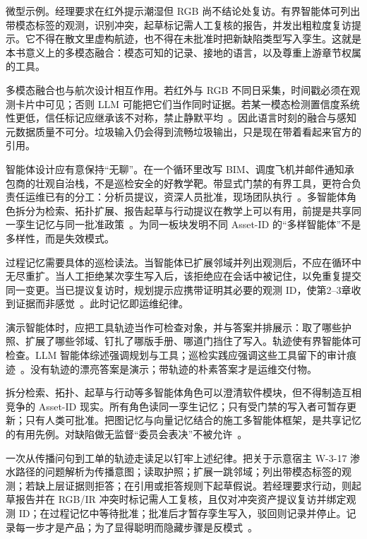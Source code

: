 微型示例。经理要求在红外提示潮湿但 RGB 尚不结论处复访。有界智能体可列出带模态标签的观测，识别冲突，起草标记需人工复核的报告，并发出粗粒度复访提示。它不得在散文里虚构航迹，也不得在未批准时把新缺陷类型写入孪生。这就是本书意义上的多模态融合：模态可知的记录、接地的语言，以及尊重上游章节权属的工具。

多模态融合也与航次设计相互作用。若红外与 RGB 不同日采集，时间戳必须在观测卡片中可见；否则 LLM 可能把它们当作同时证据。若某一模态检测置信度系统性更低，信任标记应继承该不对称，禁止静默平均~\cite{zhao2024facade,zhao2026physical}。因此语言时刻的融合与感知元数据质量不可分。垃圾输入仍会得到流畅垃圾输出，只是现在带着看起来官方的引用。

智能体设计应有意保持``无聊''。在一个循环里改写 BIM、调度飞机并邮件通知承包商的壮观自治栈，不是巡检安全的好教学靶。带显式门禁的有界工具，更符合负责任运维已有的分工：分析员提议，资深人员批准，现场团队执行~\cite{luo2025llmdtrobot,gao2026ifcagent,zhang2025llmagentschema}。多智能体角色拆分为检索、拓扑扩展、报告起草与行动提议在教学上可以有用，前提是共享同一孪生记忆与同一批准政策~\cite{wang2024surveyagents,li2024surveymultiagent,rawat2025llmmas}。为同一板块发明不同 Asset-ID 的``多样智能体''不是多样性，而是失效模式。

过程记忆需要具体的巡检读法。当智能体已扩展邻域并列出观测后，不应在循环中无尽重扩。当人工拒绝某次孪生写入后，该拒绝应在会话中被记住，以免重复提交同一变更。当已提议复访时，规划提示应携带证明其必要的观测 ID，使第2--3章收到证据而非感觉~\cite{yao2023react,rawat2025llmmas}。此时记忆即运维纪律。



演示智能体时，应把工具轨迹当作可检查对象，并与答案并排展示：取了哪些护照、扩展了哪些邻域、钉扎了哪版手册、哪道门挡住了写入。轨迹使有界智能体可检查。LLM 智能体综述强调规划与工具；巡检实践应强调这些工具留下的审计痕迹~\cite{wang2024surveyagents,li2024surveymultiagent,yao2023react,schick2023toolformer}。没有轨迹的漂亮答案是演示；带轨迹的朴素答案才是运维交付物。

拆分检索、拓扑、起草与行动等多智能体角色可以澄清软件模块，但不得制造互相竞争的 Asset-ID 现实。所有角色读同一孪生记忆；只有受门禁的写入者可暂存更新；只有人类可批准。把图记忆与向量记忆结合的施工多智能体框架，是共享记忆的有用先例。对缺陷做无监督``委员会表决''不被允许~\cite{rawat2025llmmas,gao2026ifcagent,luo2025llmdtrobot}。



一次从传播问句到工单的轨迹走读足以钉牢上述纪律。把关于示意宿主 W-3-17 渗水路径的问题解析为传播意图；读取护照；扩展一跳邻域；列出带模态标签的观测；若缺上层证据则拒答；在引用或拒答规则下起草假说。若经理要求行动，则起草报告并在 RGB/IR 冲突时标记需人工复核，且仅对冲突资产提议复访并绑定观测 ID；在过程记忆中等待批准；批准后才暂存孪生写入，驳回则记录并停止。记录每一步才是产品；为了显得聪明而隐藏步骤是反模式~\cite{yao2023react,wang2024surveyagents,luo2025llmdtrobot,gao2026ifcagent}。

